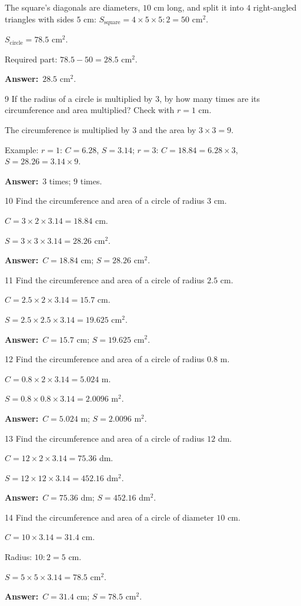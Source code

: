 \documentclass[11pt]{article}
\newif\ifsol \solfalse
\providecommand{\AnsWord}{Đáp số}
\newcommand{\dapso}[1]{\par\textbf{\AnsWord:}\ #1}
\newcommand{\probsol}[1]{%
  \begin{lrbox}{\solmeasure}\begin{minipage}{\dimexpr\linewidth-24pt\relax}#1\end{minipage}\end{lrbox}%
  \ifsol
    \begin{solbox}#1\end{solbox}%
  \else
    \setlength{\solht}{\dimexpr\ht\solmeasure+\dp\solmeasure+0.85cm\relax}%
    \ifdim\solht<1.35cm\setlength{\solht}{1.35cm}\fi
    \begin{tcolorbox}[colback=white,colframe=Line,boxrule=0.8pt,arc=5pt,
      left=8pt,right=8pt,top=4pt,bottom=4pt,height=\solht]{\footnotesize\color{Slate}\itshape\WorkWord}\end{tcolorbox}%
  \fi}
\newcommand{\gap}{\vspace{0.3cm}}
\def\WorkWord{Your work:}
\def\AnsWord{Answer}
\begin{document}
\probsol{
The square's diagonals are diameters, $10$ cm long, and split it into $4$ right-angled triangles with sides $5$ cm: $S_\text{square}=4\times5\times5:2=50$ cm$^2$.\par
$S_\text{circle}=78.5$ cm$^2$.\par Required part: $78.5-50=28.5$ cm$^2$.
\dapso{$28.5$ cm$^2$.}}
\gap
\begin{probbox}{9}{\relax}
If the radius of a circle is multiplied by $3$, by how many times are its circumference and area multiplied? Check with $r=1$ cm.
\end{probbox}
\probsol{
The circumference is multiplied by $3$ and the area by $3\times3=9$.\par Example: $r=1$: $C=6.28$, $S=3.14$; $r=3$: $C=18.84=6.28\times3$, $S=28.26=3.14\times9$.
\dapso{$3$ times; $9$ times.}}
\gap
\begin{probbox}{10}{\relax}
Find the circumference and area of a circle of radius $3$ cm.
\end{probbox}
\probsol{
$C=3\times2\times3.14=18.84$ cm.\par $S=3\times3\times3.14=28.26$ cm$^2$.
\dapso{$C=18.84$ cm; $S=28.26$ cm$^2$.}}
\gap
\begin{probbox}{11}{\relax}
Find the circumference and area of a circle of radius $2.5$ cm.
\end{probbox}
\probsol{
$C=2.5\times2\times3.14=15.7$ cm.\par $S=2.5\times2.5\times3.14=19.625$ cm$^2$.
\dapso{$C=15.7$ cm; $S=19.625$ cm$^2$.}}
\gap
\begin{probbox}{12}{\relax}
Find the circumference and area of a circle of radius $0.8$ m.
\end{probbox}
\probsol{
$C=0.8\times2\times3.14=5.024$ m.\par $S=0.8\times0.8\times3.14=2.0096$ m$^2$.
\dapso{$C=5.024$ m; $S=2.0096$ m$^2$.}}
\gap
\begin{probbox}{13}{\relax}
Find the circumference and area of a circle of radius $12$ dm.
\end{probbox}
\probsol{
$C=12\times2\times3.14=75.36$ dm.\par $S=12\times12\times3.14=452.16$ dm$^2$.
\dapso{$C=75.36$ dm; $S=452.16$ dm$^2$.}}
\gap
\begin{probbox}{14}{\relax}
Find the circumference and area of a circle of diameter $10$ cm.
\end{probbox}
\probsol{
$C=10\times3.14=31.4$ cm.\par Radius: $10:2=5$ cm.\par $S=5\times5\times3.14=78.5$ cm$^2$.
\dapso{$C=31.4$ cm; $S=78.5$ cm$^2$.}}
\end{document}
